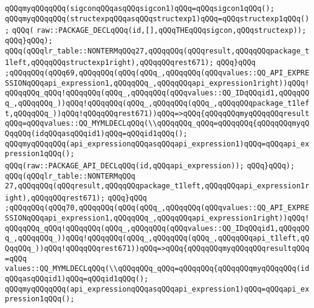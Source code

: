 \verb|qQQqmyqQQqqQQq(sigconqQQqasqQQqsigcon1)qQQq=qQQqsigcon1qQQq();|\newline
\verb|qQQqmyqQQqqQQq(structexpqQQqasqQQqstructexp1)qQQq=qQQqstructexp1qQQq();|\newline
\verb|qQQq(|\newline
\verb|raw::PACKAGE_DECLqQQq(id,[],qQQqTHEqQQqsigcon,qQQqstructexp));|\newline
\verb|qQQq}qQQq);|\newline
\verb|qQQq(qQQqlr_table::NONTERMqQQq27,qQQqqQQq(qQQqresult,qQQqqQQqpackage_t1left,qQQqqQQqstructexp1right),qQQqqQQqrest671);|\newline
\verb|qQQq}qQQq|\newline
\verb|;qQQqqQQq(qQQq69,qQQqqQQq(qQQq(qQQq_,qQQqqQQq(qQQqvalues::QQ_API_EXPRESSIONqQQqapi_expression1,qQQqqQQq_,qQQqqQQqapi_expression1right))qQQq!qQQqqQQq_qQQq!qQQqqQQq(qQQq_,qQQqqQQq(qQQqvalues::QQ_IDqQQqid1,qQQqqQQq_,qQQqqQQq_))qQQq!qQQqqQQq(qQQq_,qQQqqQQq(qQQq_,qQQqqQQqpackage_t1left,qQQqqQQq_))qQQq!qQQqqQQqrest671))qQQq=>qQQq{qQQqqQQqmyqQQqqQQqresult|\newline
\verb|qQQq=qQQqvalues::QQ_MYMLDECLqQQq(\\qQQqqQQq_qQQq=qQQqqQQq{qQQqqQQqmyqQQqqQQq(idqQQqasqQQqid1)qQQq=qQQqid1qQQq();|\newline
\verb|qQQqmyqQQqqQQq(api_expressionqQQqasqQQqapi_expression1)qQQq=qQQqapi_expression1qQQq();|\newline
\verb|qQQq(raw::PACKAGE_API_DECLqQQq(id,qQQqapi_expression));|\newline
\verb|qQQq}qQQq);|\newline
\verb|qQQq(qQQqlr_table::NONTERMqQQq|\newline
\verb|27,qQQqqQQq(qQQqresult,qQQqqQQqpackage_t1left,qQQqqQQqapi_expression1right),qQQqqQQqrest671);|\newline
\verb|qQQq}qQQq|\newline
\verb|;qQQqqQQq(qQQq70,qQQqqQQq(qQQq(qQQq_,qQQqqQQq(qQQqvalues::QQ_API_EXPRESSIONqQQqapi_expression1,qQQqqQQq_,qQQqqQQqapi_expression1right))qQQq!qQQqqQQq_qQQq!qQQqqQQq(qQQq_,qQQqqQQq(qQQqvalues::QQ_IDqQQqid1,qQQqqQQq_,qQQqqQQq_))qQQq!qQQqqQQq(qQQq_,qQQqqQQq(qQQq_,qQQqqQQqapi_t1left,qQQqqQQq_))qQQq!qQQqqQQqrest671))qQQq=>qQQq{qQQqqQQqmyqQQqqQQqresultqQQq=qQQq|\newline
\verb|values::QQ_MYMLDECLqQQq(\\qQQqqQQq_qQQq=qQQqqQQq{qQQqqQQqmyqQQqqQQq(idqQQqasqQQqid1)qQQq=qQQqid1qQQq();|\newline
\verb|qQQqmyqQQqqQQq(api_expressionqQQqasqQQqapi_expression1)qQQq=qQQqapi_expression1qQQq();|\newline
